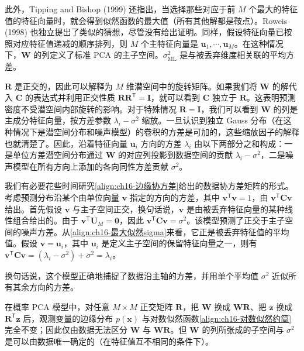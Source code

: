 \documentclass[../../main.tex]{subfiles}
\begin{document}
此外，Tipping and Bishop (1999) 还指出，当选择那些对应于前 $M$ 个最大的特征值的特征向量时，就会得到似然函数的最大值（所有其他解都是鞍点）。Roweis (1998) 也独立提出了类似的猜想，尽管没有给出证明。同样，假设特征向量已按照对应特征值递减的顺序排列，则 $M$ 个主特征向量是 $\bm{u}_1,\cdots,\bm{u}_M$。在这种情况下，$\bm{W}$ 的列定义了标准 PCA 的主子空间。$\sigma^2_{\text{ML}}$ 是与被丢弃维度相关联的平均方差。

$\bm{R}$ 是正交的，因此可以解释为 $M$ 维潜空间中的旋转矩阵。如果我们将 $\bm{W}$ 的解代入 $\bm{C}$ 的表达式并利用正交性质 $\bm{R}\bm{R}^{\mathsf T}=\bm{I}$，就可以看到 $\bm{C}$ 独立于 $\bm{R}$。这表明预测密度不受潜空间内部旋转的影响。对于特殊情况 $\bm{R}=\bm{I}$，我们可以看到 $\bm{W}$ 的列是主成分特征向量，按方差参数 $\lambda_i-\sigma^2$ 缩放。一旦认识到独立 Gauss 分布（在这种情况下是潜空间分布和噪声模型）的卷积的方差是可加的，这些缩放因子的解释也就清楚了。因此，沿着特征向量 $\bm{u}_i$ 方向的方差 $\lambda_i$ 由以下两部分之和构成：一是单位方差潜空间分布通过 $\bm{W}$ 的对应列投影到数据空间的贡献 $\lambda_i-\sigma^2$，二是噪声模型在所有方向上添加的各向同性方差贡献 $\sigma^2$。

我们有必要花些时间研究\eqref{align:ch16-边缘协方差}给出的数据协方差矩阵的形式。考虑预测分布沿某个由单位向量 $\bm{v}$ 指定的方向的方差，其中 $\bm{v}^{\mathsf T}\bm{v}=1$，由 $\bm{v}^{\mathsf T}\bm{C}\bm{v}$ 给出。首先假设 $\bm{v}$ 与主子空间正交，换句话说，$\bm{v}$ 是由被丢弃特征向量的某种线性组合给出的。由于 $\bm{v}^{\mathsf T}\bm{U}_M=\bm{0}$，因此 $\bm{v}^{\mathsf T}\bm{C}\bm{v}=\sigma^2$。该模型预测了正交于主子空间的噪声方差。从\eqref{align:ch16-最大似然sigma}来看，它正是被丢弃特征值的平均值。假设 $\bm{v}=\bm{u}_i$，其中 $\bm{u}_i$ 是定义主子空间的保留特征向量之一，则有 $\bm{v}^{\mathsf T}\bm{C}\bm{v}=(\lambda_i-\sigma^2)+\sigma^2=\lambda_i$。

换句话说，这个模型正确地捕捉了数据沿主轴的方差，并用单个平均值 $\sigma^2$ 近似所有其余方向的方差。

\begin{proposition}[潜空间旋转的不可识别性]\label{proposition:ch16-旋转不可识别}
在概率 PCA 模型中，对任意 $M\times M$ 正交矩阵 $\bm{R}$，把 $\bm{W}$ 换成 $\bm{W}\bm{R}$、把 $\bm{z}$ 换成 $\bm{R}^{\mathsf T}\bm{z}$ 后，观测变量的边缘分布 $p(\bm{x})$ 与对数似然函数\eqref{align:ch16-对数似然约简}完全不变；因此仅由数据无法区分 $\bm{W}$ 与 $\bm{W}\bm{R}$。但 $\bm{W}$ 的列所张成的子空间与 $\sigma^2$ 是可以由数据唯一确定的（在特征值互不相同的条件下）。
\end{proposition}
\end{document}
